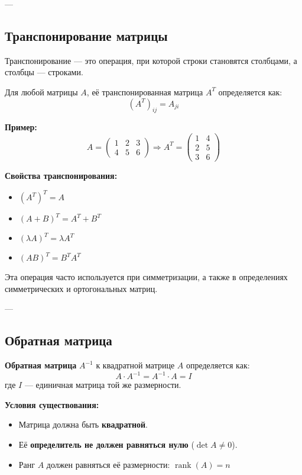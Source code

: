 ---

\subsection*{Транспонирование матрицы}

Транспонирование — это операция, при которой строки становятся столбцами, а столбцы — строками.

Для любой матрицы $A$, её транспонированная матрица $A^T$ определяется как:
\[
(A^T)_{ij} = A_{ji}
\]

\textbf{Пример:}
\[
A =
\begin{pmatrix}
1 & 2 & 3 \\
4 & 5 & 6
\end{pmatrix}
\Rightarrow
A^T =
\begin{pmatrix}
1 & 4 \\
2 & 5 \\
3 & 6
\end{pmatrix}
\]

\textbf{Свойства транспонирования:}
\begin{itemize}
  \item $(A^T)^T = A$
  \item $(A + B)^T = A^T + B^T$
  \item $(\lambda A)^T = \lambda A^T$
  \item $(AB)^T = B^T A^T$
\end{itemize}

Эта операция часто используется при симметризации, а также в определениях симметрических и ортогональных матриц.

---

\subsection*{Обратная матрица}

\textbf{Обратная матрица} $A^{-1}$ к квадратной матрице $A$ определяется как:
\[
A \cdot A^{-1} = A^{-1} \cdot A = I
\]
где $I$ — единичная матрица той же размерности.

\textbf{Условия существования:}
\begin{itemize}
  \item Матрица должна быть \textbf{квадратной}.
  \item Её \textbf{определитель не должен равняться нулю} ($\det A \ne 0$).
  \item Ранг $A$ должен равняться её размерности: $\operatorname{rank}(A) = n$
\end{itemize}

